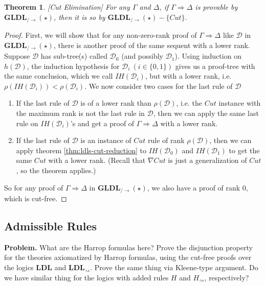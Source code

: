 \documentclass[12pt,a4paper]{article}
\theoremstyle{plain}
\newtheorem{thm}{Theorem}[section]
\theoremstyle{definition}
\begin{document}
\begin{thm}\label{thm:ldls-cut-elim}[Cut Elimination]
	For any $\Gamma$ and $\Delta$, if $\Gamma \Rightarrow \Delta$ is provable by $\mathbf{GLDL}_{/\rightarrow}(\star)$, then it is so by $\mathbf{GLDL}_{/\rightarrow}(\star)-\{Cut\}$.
\end{thm}
\begin{proof}
		First, we will show that for any non-zero-rank proof of $\Gamma \Rightarrow \Delta$ like $\mathcal{D}$ in $\mathbf{GLDL}_{/\rightarrow}(\star)$, there is another proof of the same sequent with a lower rank. Suppose $\mathcal{D}$ has sub-tree(s) called $\mathcal{D}_0$ (and possibly $\mathcal{D}_1$). Using induction on $h(\mathcal{D})$, the induction hypothesis for $\mathcal{D}_i ~(i \in \{0,1\})$ gives us a proof-tree with the same conclusion, which we call $IH(\mathcal{D}_i)$, but with a lower rank, i.e. $\rho(IH(\mathcal{D}_i)) < \rho(\mathcal{D}_i)$. We now consider two cases for the last rule of $\mathcal{D}$

	\begin{enumerate}[label=\Roman*]
		\item If the last rule of $\mathcal{D}$ is of a lower rank than $\rho(\mathcal{D})$, i.e. the $Cut$ instance with the maximum rank is not the last rule in $\mathcal{D}$, then we can apply the same last rule on $IH(\mathcal{D}_i)$'s and get a proof of $\Gamma \Rightarrow \Delta$ with a lower rank.
		
		\item If the last rule of $\mathcal{D}$ is an instance of $Cut$ rule of rank $\rho(\mathcal{D})$, then we can apply theorem \ref{thm:ldls-cut-reduction} to $IH(\mathcal{D}_0)$ and $IH(\mathcal{D}_1)$ to get the same $Cut$ with a lower rank. (Recall that $\nabla Cut$ is just a generalization of $Cut$, so the theorem applies.)
	\end{enumerate}
	So for any proof of $\Gamma \Rightarrow \Delta$ in $\mathbf{GLDL}_{/\rightarrow}(\star)$, we also have a proof of rank $0$, which is cut-free.
\end{proof}

\subsection{Admissible Rules}
\textbf{Problem.} What are the Harrop formulas here? Prove the disjunction property for the theories axiomatized by Harrop formulas, using the cut-free proofs over the logics $\mathbf{LDL}$ and $\mathbf{LDL}_{\rightsquigarrow}$. Prove the same thing via Kleene-type argument. Do we have similar thing for the logics with added rules $H$ and $H_{\rightsquigarrow}$, respectively?
\end{document}
